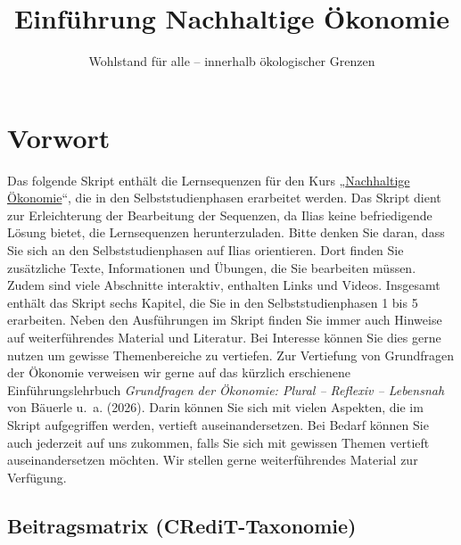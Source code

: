 \documentclass[
  nswissgerman,
  a4paper,
  DIV=11,
  numbers=noendperiod,
  oneside,
  openany]{scrreprt}
\title{Einführung Nachhaltige Ökonomie}
\subtitle{Wohlstand für alle -- innerhalb ökologischer Grenzen}
\author{}
\date{}
\renewcommand*\contentsname{Inhaltsverzeichnis}
\newcommand\contentsname{Inhaltsverzeichnis}
\begin{document}
\maketitle

\renewcommand*\contentsname{Inhaltsverzeichnis}
{
\setcounter{tocdepth}{2}
\tableofcontents
}


\chapter*{Vorwort}\label{vorwort}


Das folgende Skript enthält die Lernsequenzen für den Kurs
„\href{https://ilias.unibe.ch/go/crs/3701540}{Nachhaltige Ökonomie}``,
die in den Selbststudienphasen erarbeitet werden. Das Skript dient zur
Erleichterung der Bearbeitung der Sequenzen, da Ilias keine
befriedigende Lösung bietet, die Lernsequenzen herunterzuladen. Bitte
denken Sie daran, dass Sie sich an den Selbststudienphasen auf Ilias
orientieren. Dort finden Sie zusätzliche Texte, Informationen und
Übungen, die Sie bearbeiten müssen. Zudem sind viele Abschnitte
interaktiv, enthalten Links und Videos. Insgesamt enthält das Skript
sechs Kapitel, die Sie in den Selbststudienphasen 1 bis 5 erarbeiten.
Neben den Ausführungen im Skript finden Sie immer auch Hinweise auf
weiterführendes Material und Literatur. Bei Interesse können Sie dies
gerne nutzen um gewisse Themenbereiche zu vertiefen. Zur Vertiefung von
Grundfragen der Ökonomie verweisen wir gerne auf das kürzlich
erschienene Einführungslehrbuch \emph{Grundfragen der Ökonomie: Plural
-- Reflexiv -- Lebensnah} von Bäuerle u.~a. (2026). Darin können Sie
sich mit vielen Aspekten, die im Skript aufgegriffen werden, vertieft
auseinandersetzen. Bei Bedarf können Sie auch jederzeit auf uns
zukommen, falls Sie sich mit gewissen Themen vertieft auseinandersetzen
möchten. Wir stellen gerne weiterführendes Material zur Verfügung.

\section*{Beitragsmatrix
(CRediT-Taxonomie)}\label{beitragsmatrix-credit-taxonomie}

\end{document}
